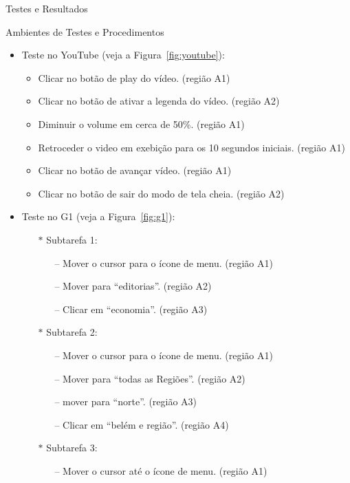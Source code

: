\begin{chapter}{Testes e Resultados}
\begin{section}{Ambientes de Testes e Procedimentos}
\begin{itemize}
\item Teste no YouTube (veja a Figura~\ref{fig:youtube}):
	\begin{itemize}
	\renewcommand\labelitemi{--}
	\item Clicar no botão de play do vídeo.                            \hfill (região A1)
	\item Clicar no botão de ativar a legenda do vídeo.                 \hfill (região A2)
	\item Diminuir o volume em cerca de 50\%.                          \hfill (região A1)
	\item Retroceder o video em exebição para os 10 segundos iniciais. \hfill (região A1)
	\item Clicar no botão de avançar vídeo.                            \hfill (região A1)
	\item Clicar no botão de sair do modo de tela cheia.               \hfill (região A2)
	\end{itemize}
\item Teste no G1 (veja a Figura~\ref{fig:g1}):
	\begin{itemize}
	\item[$\ast$] Subtarefa 1:
		\begin{itemize}
		\item[--] Mover o cursor para o ícone de menu.                   \hfill (região A1)
		\item[--] Mover para ``editorias''.                              \hfill (região A2)
		\item[--] Clicar em ``economia''.                                \hfill (região A3)
		\end{itemize}
	\item[$\ast$] Subtarefa 2:
		\begin{itemize}
		\item[--] Mover o cursor para o ícone de menu.                   \hfill (região A1)
		\item[--] Mover para ``todas as Regiões''.                       \hfill (região A2)
		\item[--] mover para ``norte''.                                  \hfill (região A3)
		\item[--] Clicar em ``belém e região''.                          \hfill (região A4)
		\end{itemize}
	\item[$\ast$] Subtarefa 3:
		\begin{itemize}
		\item[--] Mover o cursor até o ícone de menu.                    \hfill(região A1)

\end{itemize}
\end{itemize}
\end{itemize}
\end{section}
\end{chapter}
